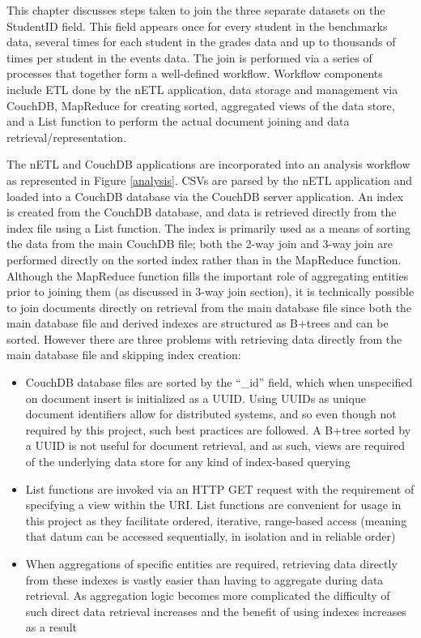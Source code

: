 \label{chapter-analysis}
This chapter discusses steps taken to join the three separate datasets on the StudentID field. This field appears once for every student in the benchmarks data, several times for each student in the grades data and up to thousands of times per student in the events data. The join is performed via a series of processes that together form a well-defined workflow. Workflow components include ETL done by the nETL application, data storage and management via CouchDB, MapReduce for creating sorted, aggregated views of the data store, and a List function to perform the actual document joining and data retrieval/representation.

The nETL and CouchDB applications are incorporated into an analysis workflow as represented in Figure \ref{analysis}. CSVs are parsed by the nETL application and loaded into a CouchDB database via the CouchDB server application. An index is created from the CouchDB database, and data is retrieved directly from the index file using a List function. The index is primarily used as a means of sorting the data from the main CouchDB file; both the 2-way join and 3-way join are performed directly on the sorted index rather than in the MapReduce function. Although the MapReduce function fills the important role of aggregating entities prior to joining them (as discussed in 3-way join section), it is technically possible to join documents directly on retrieval from the main database file since both the main database file and derived indexes are structured as B+trees and can be sorted. However there are three problems with retrieving data directly from the main database file and skipping index creation:

\begin{itemize}
    \item CouchDB database files are sorted by the ``\_id'' field, which when unspecified on document insert is initialized as a UUID. Using UUIDs as unique document identifiers allow for distributed systems, and so even though not required by this project, such best practices are followed. A B+tree sorted by a UUID is not useful for document retrieval, and as such, views are required of the underlying data store for any kind of index-based querying
    \item List functions are invoked via an HTTP GET request with the requirement of specifying a view within the URI. List functions are convenient for usage in this project as they facilitate ordered, iterative, range-based access (meaning that datum can be accessed sequentially, in isolation and in reliable order)
    \item When aggregations of specific entities are required, retrieving data directly from these indexes is vastly easier than having to aggregate during data retrieval. As aggregation logic becomes more complicated the difficulty of such direct data retrieval increases and the benefit of using indexes increases as a result
\end{itemize}

